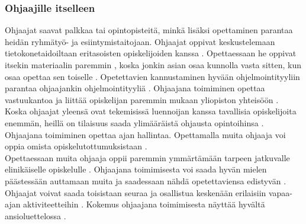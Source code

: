 \documentclass[finnish]{tktltiki2}
\theoremstyle{definition}
\theoremstyle{remark}
\begin{document}
\subsubsection{Ohjaajille itselleen}
Ohjaajat saavat palkkaa tai opintopisteitä, minkä lisäksi opettaminen parantaa heidän ryhmätyö- ja esiintymistaitojaan. Ohjaajat oppivat keskustelemaan tietokonetaidoiltaan eritasoisten opiskelijoiden kanssa \cite{Vikberg}. Opettaessaan he oppivat itsekin materiaalin paremmin \cite{Reges03}, koska jonkin asian osaa kunnolla vasta sitten, kun osaa opettaa sen toiselle \cite{Bernstein, Dickson11}. Opetettavien kannustaminen hyvään ohjelmointityyliin parantaa ohjaajankin ohjelmointityyliä \cite{Roberts95}. Ohjaajana toimiminen opettaa vastuukantoa ja liittää opiskelijan paremmin mukaan yliopiston yhteisöön \cite{Dickson11}. Koska ohjaajat yleensä ovat tekemisissä luennoijan kanssa tavallisia opiskelijoita enemmän, heillä on tilaisuus saada ylimääräistä ohjausta opintoihinsa \cite{Aminzadeh}. Ohjaajana toimiminen opettaa ajan hallintaa. Opettamalla muita ohjaaja voi oppia omista opiskelutottumuksistaan \cite{Ferstl10}. 
\\
Opettaessaan muita ohjaaja oppii paremmin ymmärtämään tarpeen jatkuvalle elinikäiselle opiskelulle \cite{Paxton05}. Ohjaajana toimimisesta voi saada hyvän mielen päästessään auttamaan muita \cite{Aminzadeh} ja saadessaan nähdä opetettaviensa edistyvän \cite{Kurhila11}. Ohjaajat voivat saada toisistaan seuraa ja osallistua keskenään erilaisiin vapaa-ajan aktiviteetteihin \cite{Roberts95}. Kokemus ohjaajana toimimisesta näyttää hyvältä ansioluettelossa \cite{Ferstl10}.
\end{document}
